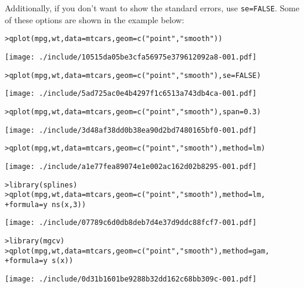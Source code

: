 Additionally, if you don't want to show the standard errors, use {\tt se=FALSE}.  Some of these options are shown in the example below:

\begin{alltt}
> qplot(mpg, wt, data = mtcars, geom = c("point", "smooth"))
\end{alltt}
\texttt{[image: ./include/10515da05be3cfa56975e379612092a8-001.pdf]}
\begin{alltt}

> qplot(mpg, wt, data = mtcars, geom = c("point", "smooth"), se = FALSE)
\end{alltt}
\texttt{[image: ./include/5ad725ac0e4b4297f1c6513a743db4ca-001.pdf]}
\begin{alltt}

> qplot(mpg, wt, data = mtcars, geom = c("point", "smooth"), span = 0.3)
\end{alltt}
\texttt{[image: ./include/3d48af38dd0b38ea90d2bd7480165bf0-001.pdf]}
\begin{alltt}

> qplot(mpg, wt, data = mtcars, geom = c("point", "smooth"), method = lm)
\end{alltt}
\texttt{[image: ./include/a1e77fea89074e1e002ac162d02b8295-001.pdf]}
\begin{alltt}

> library(splines)
> qplot(mpg, wt, data = mtcars, geom = c("point", "smooth"), method = lm, 
+     formula = y ~ ns(x, 3))
\end{alltt}
\texttt{[image: ./include/07789c6d0db8deb7d4e37d9ddc88fcf7-001.pdf]}
\begin{alltt}

> library(mgcv)
> qplot(mpg, wt, data = mtcars, geom = c("point", "smooth"), method = gam, 
+     formula = y ~ s(x))
\end{alltt}
\texttt{[image: ./include/0d31b1601be9288b32dd162c68bb309c-001.pdf]}
\begin{alltt}

\end{alltt}

